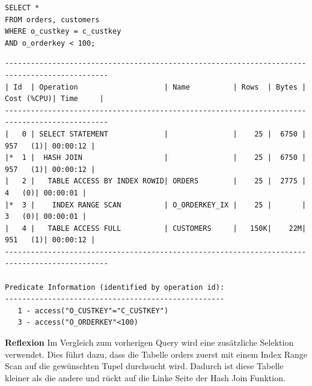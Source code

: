 \documentclass[10pt]{article}
\begin{document}
\begin{lstlisting}[style=sql]
SELECT *
FROM orders, customers
WHERE o_custkey = c_custkey
AND o_orderkey < 100;
\end{lstlisting}
\begin{lstlisting}[style=queryexecutionplan]
----------------------------------------------------------------------------------------------
| Id  | Operation                    | Name          | Rows  | Bytes | Cost (%CPU)| Time     |
----------------------------------------------------------------------------------------------
|   0 | SELECT STATEMENT             |               |    25 |  6750 |   957   (1)| 00:00:12 |
|*  1 |  HASH JOIN                   |               |    25 |  6750 |   957   (1)| 00:00:12 |
|   2 |   TABLE ACCESS BY INDEX ROWID| ORDERS        |    25 |  2775 |     4   (0)| 00:00:01 |
|*  3 |    INDEX RANGE SCAN          | O_ORDERKEY_IX |    25 |       |     3   (0)| 00:00:01 |
|   4 |   TABLE ACCESS FULL          | CUSTOMERS     |   150K|    22M|   951   (1)| 00:00:12 |
----------------------------------------------------------------------------------------------
 
Predicate Information (identified by operation id):
---------------------------------------------------
   1 - access("O_CUSTKEY"="C_CUSTKEY")
   3 - access("O_ORDERKEY"<100)
\end{lstlisting}
\textbf{Reflexion} \newline
Im Vergleich zum vorherigen Query wird eine zusätzliche Selektion verwendet. Dies führt dazu, dass die 
Tabelle orders zuerst mit einem Index Range Scan auf die gewünschten Tupel durchsucht wird. Dadurch ist 
diese Tabelle kleiner als die andere und rückt auf die Linke Seite der Hash Join Funktion.
\end{document}
